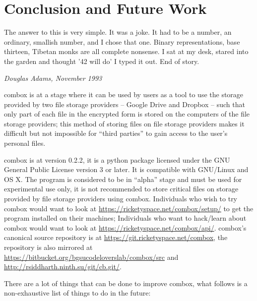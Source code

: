 \chapter{Conclusion and Future Work}\label{ch:5}

\epigraph{The answer to this is very simple. It was a joke. It had to
  be a number, an ordinary, smallish number, and I chose that
  one. Binary representations, base thirteen, Tibetan monks are all
  complete nonsense. I sat at my desk, stared into the garden and
  thought '42 will do' I typed it out. End of story.
}{\textit{Douglas Adams, November 1993}}

combox is at a stage where it can be used by users as a tool to use
the storage provided by two file storage providers -- Google Drive and
Dropbox -- such that only part of each file in the encrypted form is
stored on the computers of the file storage providers; this method of
storing files on file storage providers makes it difficult but not
impossible for ``third parties'' to gain access to the user's personal
files.

combox is at version 0.2.2, it is a python package licensed under the
GNU General Public License version 3 or later. It is compatible with
GNU/Linux and OS X. The program is considered to be in ``alpha'' stage
and must be used for experimental use only, it is not recommended to
store critical files on storage provided by file storage providers
using combox. Individuals who wish to try combox would want to look at
\url{https://ricketyspace.net/combox/setup/} to get the program
installed on their machines; Individuals who want to hack/learn about
combox would want to look at
\url{https://ricketyspace.net/combox/api/}. combox's canonical source
repository is at \url{https://git.ricketyspace.net/combox}, the
repository is also mirrored at
\url{https://bitbucket.org/bgsucodeloverslab/combox/src} and
\url{http://rsiddharth.ninth.su/git/cb.git/}.

There are a lot of things that can be done to improve combox, what
follows is a non-exhaustive list of things to do in the future:

